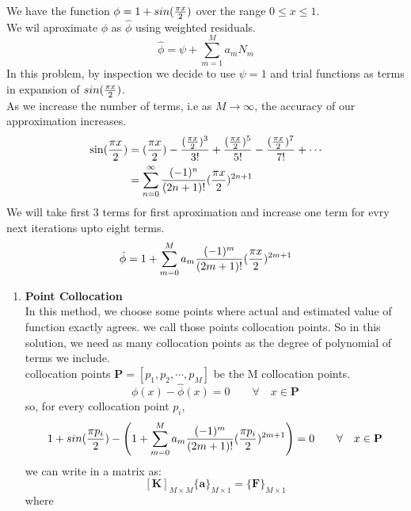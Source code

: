 \documentclass[11pt,paper=a4,answers]{exam}
\begin{document}
\begin{questions}
\pointformat{\boldmath\themarginpoints}
\question
We have the function $\phi = 1 + sin({\pi x \over 2})$ over the range $0\leq x \leq 1$.\\
We wil aproximate $\phi$ as $\hat{\phi}$ using weighted residuals.
$$\hat{\phi} = \psi + \sum_{m=1}^M a_m N_m$$
In this problem, by inspection we decide to use $\psi = 1$ and trial functions as terms in expansion of $sin({\pi x \over 2})$.\\
As we increase the number of terms, i.e as $M \longrightarrow \infty$, the accuracy of our approximation increases.\\
\begin{align}
\sin ({\pi x \over 2}) & = ({\pi x \over 2}) - \frac{({\pi x \over 2})^3}{3!} + \frac{({\pi x \over 2})^5}{5!} - \frac{({\pi x \over 2})^7}{7!} + \cdots \\
& = \sum_{n=0}^\infty \frac{(-1)^n}{(2n+1)!}({\pi x \over 2})^{2n+1}
\end{align}
We will take first 3 terms for first aproximation and increase one term for evry next iterations upto eight terms.
$$\hat{\phi} = 1 + \sum_{m=0}^M a_m \frac{(-1)^m}{(2m+1)!}({\pi x \over 2})^{2m+1}$$
\begin{enumerate}[]
    \item \textbf{Point Collocation}\\
    In this method, we choose some points where actual and estimated value of function exactly agrees.
    we call those points collocation points. So in this solution, we need as many collocation points as the degree of polynomial of terms we include.\\
    collocation points $\mathbf{P} = [p_1, p_2, \cdots, p_M]$ be the M collocation points.\\
    $$\phi(x) -\hat{\phi}(x) = 0 \qquad \forall \quad x \in \mathbf{P}$$
    so, for every collocation point $p_i$,\\
    \begin{align}
        1 + sin({\pi p_i \over 2}) - \left(1 + \sum_{m=0}^M a_m \frac{(-1)^m}{(2m+1)!}({\pi p_i \over 2})^{2m+1}\right) &= 0 \qquad \forall \quad x \in \mathbf{P} \nonumber \\
    \end{align}
    we can write in a matrix as:
    $$[\mathbf{K}]_{M \times M} \{\mathbf{a}\}_{M \times 1} = \{\mathbf{F}\}_{M \times 1}$$
    \newpage
    where
    \begin{enumerate}[]

\end{enumerate}
\end{enumerate}
\end{questions}
\end{document}
